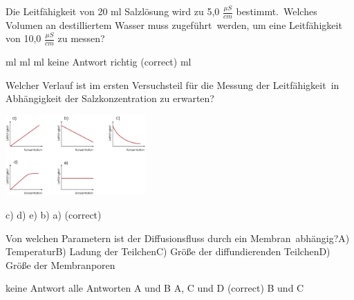 \documentclass[11pt]{exam}
\begin{document}
\setlength{\voffset}{-0.5in}
\setlength{\headsep}{5pt}

\hspace{2mm}
 \hspace{5mm}
\vspace{4mm}

\begin{questions}

\question Die Leitfähigkeit von 20 ml Salzlösung wird zu 5,0 \( \frac{\mu S}{cm} \) bestimmt. Welches Volumen an destilliertem Wasser muss zugeführt werden, um eine Leitfähigkeit von 10,0 \( \frac{\mu S}{cm} \) zu messen?

\begin{choices}
	 ml
	 ml
	 ml
	\choice keine Antwort richtig (correct)
	 ml
\end{choices}

\vspace{3mm}\question Welcher Verlauf ist im ersten Versuchsteil für die Messung der Leitfähigkeit in Abhängigkeit der Salzkonzentration zu erwarten? 

\includegraphics[width=0.4\textwidth]{images/Leitfaehigkeit.png}

\begin{choices}
	\choice c)
	\choice d)
	\choice e)
	\choice b)
	\choice a) (correct)
\end{choices}

\vspace{3mm}\question Von welchen Parametern ist der Diffusionsfluss durch ein Membran abhängig?A) TemperaturB) Ladung der TeilchenC) Größe der diffundierenden TeilchenD) Größe der Membranporen

\begin{choices}
	\choice keine Antwort
	\choice alle Antworten
	\choice A und B
	\choice A, C und D (correct)
	\choice B und C
\end{choices}


\end{questions}
\end{document}
